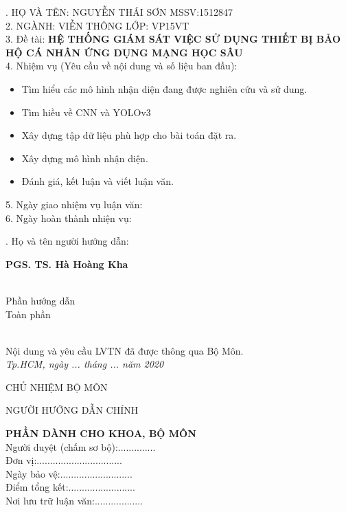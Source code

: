 \documentclass[12pt]{report}
\begin{document}
{. HỌ VÀ TÊN: NGUYỄN THÁI SƠN \hfill MSSV:1512847\\
2. NGÀNH: VIỄN THÔNG \hfill LỚP: VP15VT\\
3. Đề tài: \textbf{HỆ THỐNG GIÁM SÁT VIỆC SỬ DỤNG THIẾT BỊ BẢO HỘ CÁ NHÂN ỨNG DỤNG MẠNG HỌC SÂU}\\
4. Nhiệm vụ (Yêu cầu về nội dung và số liệu ban đầu):
\begin{itemize}[topsep=0pt,itemsep=-1ex,partopsep=1ex,parsep=1ex]
	\item Tìm hiểu các mô hình nhận diện đang được nghiên cứu và sử dung.
	\item Tìm hiều về CNN và YOLOv3
	\item Xây dựng tập dữ liệu phù hợp cho bài toán đặt ra.
	\item Xây dựng mô hình nhận diện.
	\item Đánh giá, kết luận và viết luận văn.
\end{itemize}
5. Ngày giao nhiệm vụ luận văn:\dotfill\\
6. Ngày hoàn thành nhiện vụ:\dotfill
\linespread{0.0}\vspace{-0.7em}
\begin{multicols}{2}
	. Họ và tên người hướng dẫn:
	\begin{center}
	\dotfill \textbf{PGS. TS. Hà Hoàng Kha} \dotfill\\
	\dotfill \\
	\end{center}
	\columnbreak
	\begin{center}
	Phần hướng dẫn\\
	\dotfill Toàn phần \dotfill\\
	\dotfill \\
	\end{center}
\linespread{0.0}\vspace{-0.7em}
\end{multicols}
\noindent
Nội dung và yêu cầu LVTN đã được thông qua Bộ Môn.\\
\textit{Tp.HCM, ngày ... tháng ... năm 2020}
\begin{multicols}{2}
	\begin{center}
		CHỦ NHIỆM BỘ MÔN
	\end{center}
	\columnbreak
	\begin{center}
		NGƯỜI HƯỚNG DẪN CHÍNH
	\end{center}
\end{multicols}
\vfill
\noindent
\textbf{PHẦN DÀNH CHO KHOA, BỘ MÔN}\\
Người duyệt (chấm sơ bộ):..............\\
Đơn vị:................................\\
Ngày bảo vệ:...........................\\
Điểm tổng kết:.........................\\
Nơi lưu trữ luận văn:..................
}
\newpage
\end{document}
